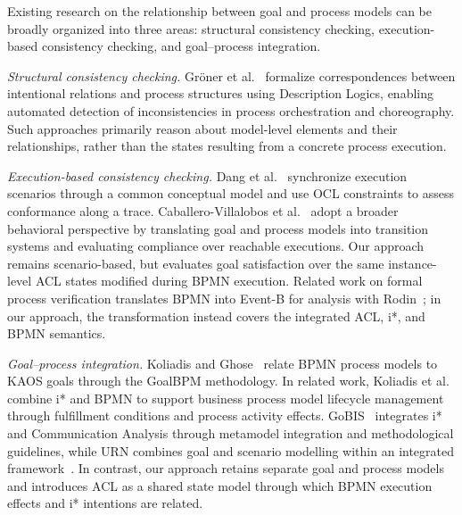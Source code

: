 \documentclass[a4paper, conference]{IEEEtran}
\begin{document}

Existing research on the relationship between goal and process models can be broadly organized into three areas: structural consistency checking, execution-based consistency checking, and goal--process integration.

\textit{Structural consistency checking.}
Gr\"oner et al.~\cite{groner2014vadl} formalize correspondences between intentional relations and process structures using Description Logics, enabling automated detection of inconsistencies in process orchestration and choreography. Such approaches primarily reason about model-level elements and their relationships, rather than the states resulting from a concrete process execution.

\textit{Execution-based consistency checking.}
Dang et al.~\cite{dang2010jucs} synchronize execution scenarios through a common conceptual model and use OCL constraints to assess conformance along a trace. Caballero-Villalobos et al.~\cite{caballero2026alig} adopt a broader behavioral perspective by translating goal and process models into transition systems and evaluating compliance over reachable executions. Our approach remains scenario-based, but evaluates goal satisfaction over the same instance-level ACL states modified during BPMN execution. Related work on formal process verification translates BPMN into Event-B for analysis with Rodin~\cite{bryans2010eventb}; in our approach, the transformation instead covers the integrated ACL, i*, and BPMN semantics.

\textit{Goal--process integration.}
Koliadis and Ghose~\cite{koliadis2006goalbpm} relate BPMN process models to KAOS goals through the GoalBPM methodology. In related work, Koliadis et al.~\cite{koliadis2006ibpmn} combine i* and BPMN to support business process model lifecycle management through fulfillment conditions and process activity effects. GoBIS~\cite{gobis2015} integrates i* and Communication Analysis through metamodel integration and methodological guidelines, while URN combines goal and scenario modelling within an integrated framework~\cite{amyot2022combining}. In contrast, our approach retains separate goal and process models and introduces ACL as a shared state model through which BPMN execution effects and i* intentions are related.
\end{document}
